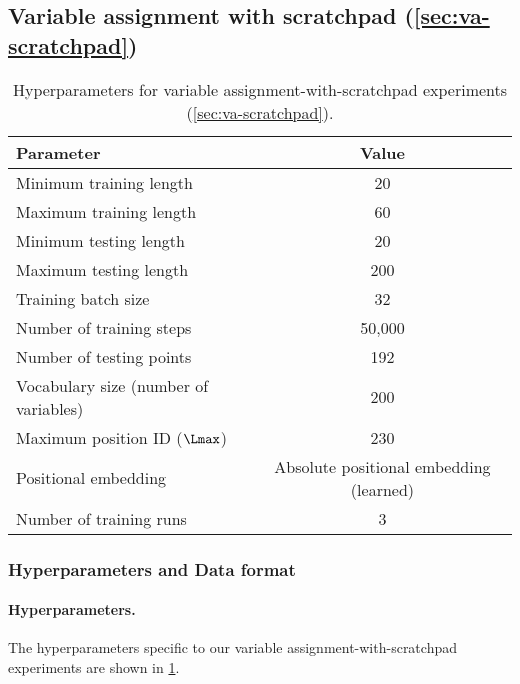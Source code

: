 \documentclass{article}
\begin{document}
\subsection{Variable assignment with scratchpad (\cref{sec:va-scratchpad})}
\label{sec:var-assign}


\begin{table}[ht]
\centering
\begin{tabular}{l c}
\hline
\textbf{Parameter} & \textbf{Value} \\
\hline
Minimum training length & 20 \\
Maximum training length & 60 \\
Minimum testing length  & 20 \\
Maximum testing length  & 200 \\
Training batch size     & 32 \\
Number of training steps & 50,000 \\
Number of testing points & 192 \\
Vocabulary size  (number of variables)        & 200 \\
Maximum position ID ($\Lmax$) & 230 \\
  Positional embedding & Absolute positional embedding (learned) \\
  Number of training runs & 3\footnotemark \\
\hline
\end{tabular}
\caption{Hyperparameters for variable assignment-with-scratchpad experiments (\cref{sec:va-scratchpad}).}
\label{tab:va-params}
\end{table}

\subsubsection{Hyperparameters and Data format}
\label{sec:data-format-va-scratchpad}
\paragraph{Hyperparameters.} The hyperparameters specific to our variable assignment-with-scratchpad experiments are shown in \cref{tab:va-params}. 
\end{document}
